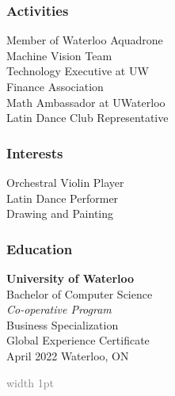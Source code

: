 \documentclass{mxresume}
\begin{document}
\begin{minipage}[t]{0.26\textwidth}
\begin{sidebar}
\subsubsection*{Activities}
Member of Waterloo Aquadrone \\
Machine Vision Team\\[1mm]
Technology Executive at UW \\
Finance Association \\[1mm]
Math Ambassador at UWaterloo \\[1mm]
Latin Dance Club Representative
\subsubsection*{Interests}
Orchestral Violin Player \\[1mm]
Latin Dance Performer \\[1mm]
Drawing and Painting
\subsubsection*{Education}
\textbf{University of Waterloo} \\[1.2mm]
Bachelor of Computer Science \\
\textit{Co-operative Program} \\[1.2mm]
\tab Business Specialization \\
\tab Global Experience Certificate \\[2mm]
April 2022 \GBar Waterloo, ON
\end{sidebar}
\end{minipage}
%
\hfill\textcolor{gray}{\vline width 1pt}\hfill
\end{document}
